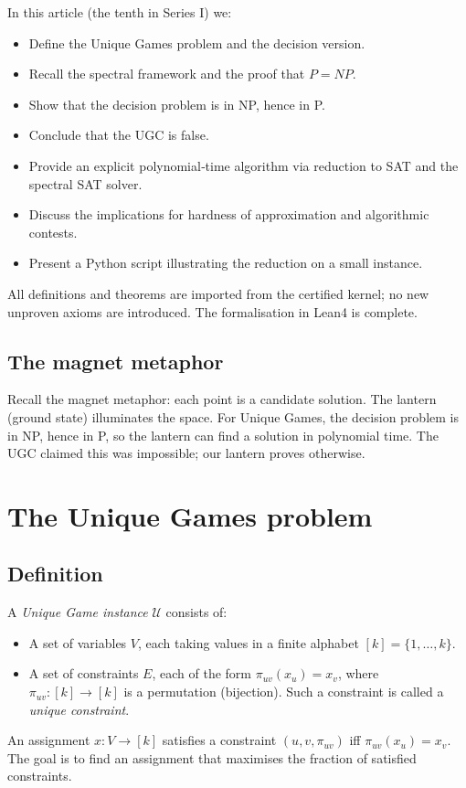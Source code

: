 \documentclass[11pt,a4paper]{article}
\begin{document}
In this article (the tenth in Series I) we:
\begin{itemize}
\item Define the Unique Games problem and the decision version.
\item Recall the spectral framework and the proof that $P = NP$.
\item Show that the decision problem is in NP, hence in P.
\item Conclude that the UGC is false.
\item Provide an explicit polynomial‑time algorithm via reduction to SAT and the spectral SAT solver.
\item Discuss the implications for hardness of approximation and algorithmic contests.
\item Present a Python script illustrating the reduction on a small instance.
\end{itemize}
All definitions and theorems are imported from the certified kernel; no new unproven axioms are introduced. The formalisation in Lean4 is complete.

\subsection{The magnet metaphor}

Recall the magnet metaphor: each point is a candidate solution. The lantern (ground state) illuminates the space. For Unique Games, the decision problem is in NP, hence in P, so the lantern can find a solution in polynomial time. The UGC claimed this was impossible; our lantern proves otherwise.

\section{The Unique Games problem}

\subsection{Definition}
A \emph{Unique Game instance} $\mathcal{U}$ consists of:
\begin{itemize}
\item A set of variables $V$, each taking values in a finite alphabet $[k] = \{1,\dots,k\}$.
\item A set of constraints $E$, each of the form $\pi_{uv}(x_u) = x_v$, where $\pi_{uv}: [k] \to [k]$ is a permutation (bijection). Such a constraint is called a \emph{unique constraint}.
\end{itemize}
An assignment $x: V \to [k]$ satisfies a constraint $(u,v,\pi_{uv})$ iff $\pi_{uv}(x_u) = x_v$. The goal is to find an assignment that maximises the fraction of satisfied constraints.
\end{document}
